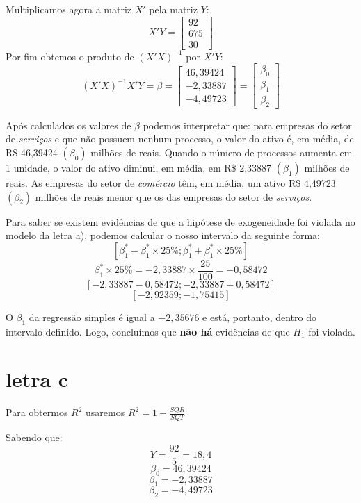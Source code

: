 Multiplicamos agora a matriz \(X'\) pela matriz \(Y\):
\[
    X'Y =
    \begin{bmatrix}
        92 \\
        675 \\
        30
    \end{bmatrix}
\]
 Por fim obtemos o produto de \((X'X)^{-1}\) por \(X'Y\):
 \[
    (X'X)^{-1}X'Y = \beta =
    \begin{bmatrix}
        46,39424 \\
        -2,33887 \\
        -4,49723
    \end{bmatrix} =
    \begin{bmatrix}
        \beta_{0} \\
        \beta_{1} \\
        \beta_{2}
    \end{bmatrix}
 \]

Após calculados os valores de \(\beta\) podemos interpretar que: para empresas do setor de \textit{serviços} e que não possuem nenhum processo, o valor do ativo é, em média, de R\$ 46,39424 \((\beta_{0})\) milhões de reais. Quando o número de processos aumenta em 1 unidade, o valor do ativo diminui, em média, em R\$ 2,33887 \((\beta_{1})\) milhões de reais. As empresas do setor de \textit{comércio} têm, em média, um ativo R\$ 4,49723 \((\beta_{2})\) milhões de reais menor que os das empresas do setor de \textit{serviços}.

Para saber se existem evidências de que a hipótese de exogeneidade foi violada no modelo da letra a), podemos calcular o nosso intervalo da seguinte forma:
\[ [\beta^{*}_{1}-\beta^{*}_{1} \times 25\%;\beta^{*}_{1}+\beta^{*}_{1} \times 25\%]\]
\[\beta^{*}_{1} \times 25\% = -2,33887 \times \frac{25}{100} = -0,58472\]
\[[-2,33887 - 0,58472;-2,33887 + 0,58472]\]
\[[-2,92359;-1,75415]\]

O \(\beta_{1}\) da regressão simples é igual a \(-2,35676\) e está, portanto, dentro do intervalo definido. Logo, concluímos que \textbf{não há} evidências de que \(H_{1}\) foi violada.

\section{letra c}
Para obtermos \(R^{2}\) usaremos \(R^{2} = 1 - \frac{SQR}{SQT}\)

Sabendo que:
\[\bar{Y} = \frac{92}{5} = 18,4 \]
\[\beta_{0} = 46,39424 \]
\[\beta_{1} = -2,33887 \]
\[\beta_{2} = -4,49723 \]

